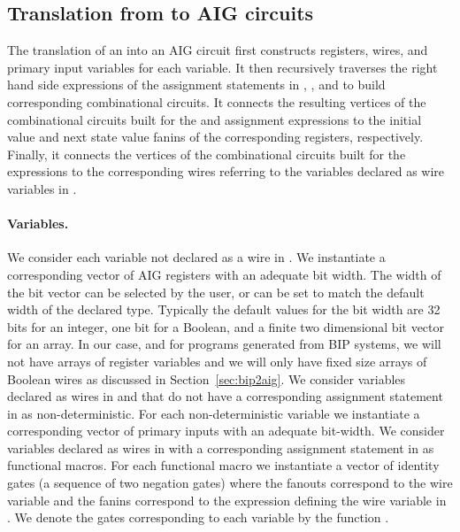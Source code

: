 
\subsection{Translation from \caig to AIG circuits }

The translation of an \caig into an AIG circuit
first constructs registers, wires, and primary input variables for each 
\caig variable. 
%
It then recursively traverses the right hand side expressions 
of the assignment statements in , ,
and  to build corresponding combinational circuits.
%
It connects the resulting vertices of the combinational 
circuits built for the  and  
assignment expressions to the 
initial value and next state value fanins of the corresponding 
registers, respectively. 
%
Finally, it connects the vertices of the combinational circuits built 
for the  expressions to the corresponding 
wires referring to the 
variables declared as wire variables in .

\paragraph{Variables.} 
%
We consider each variable not declared as a wire in .
We instantiate a corresponding 
vector of AIG registers with an adequate bit width. 
The width of the bit vector can be selected by the user, 
or can be set to match the default width of the declared type. 
Typically the default values for the bit width are 
32 bits for an integer, one bit for a Boolean, and a 
finite two dimensional bit vector for an array. 
In our case, and for \caig programs generated from BIP systems, 
we will not have arrays of register variables
and we will only have fixed size arrays of Boolean wires as 
discussed in Section~\ref{sec:bip2aig}.
%
We consider variables declared as wires in 
and that do not have a corresponding assignment statement 
in  as non-deterministic. 
For each non-deterministic variable we instantiate a corresponding
vector of primary inputs with an adequate bit-width. 
%
We consider variables declared as wires in  with 
a corresponding assignment statement in  as functional macros. 
For each functional macro we 
instantiate a vector of identity gates (a sequence of two negation gates) 
where the fanouts correspond to the wire variable and the fanins correspond to
the expression defining the wire variable in . 
%
We denote the gates corresponding to each variable by the function . 

